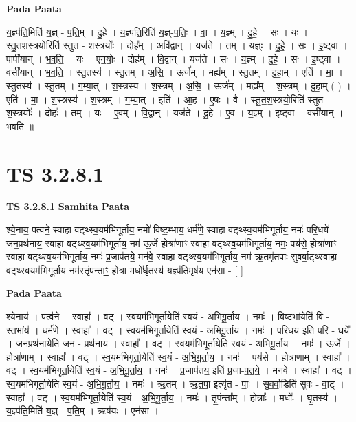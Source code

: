 \documentclass[17pt]{extarticle}
\begin{document}
\textbf{Pada Paata} \newline

य॒ज्ञ्प॑ति॒मिति॑ य॒ज्ञ् - प॒ति॒म् । दु॒हे । य॒ज्ञ्प॑ति॒रिति॑ य॒ज्ञ्-प॒तिः॒ । वा॒ । य॒ज्ञ्म् । दु॒हे॒ । सः । यः । स्तु॒त॒श॒स्त्रयो॒रिति॑ स्तुत - श॒स्त्रयोः᳚ । दोह᳚म् । अवि॑द्वान् । यज॑ते । तम् । य॒ज्ञ्ः । दु॒हे॒ । सः । इ॒ष्ट्वा । पापी॑यान् । भ॒व॒ति॒ । यः । ए॒न॒योः॒ । दोह᳚म् । वि॒द्वान् । यज॑ते । सः । य॒ज्ञ्म् । दु॒हे॒ । सः । इ॒ष्ट्वा । वसी॑यान् । भ॒व॒ति॒ । स्तु॒तस्य॑ । स्तु॒तम् । अ॒सि॒ । ऊर्ज᳚म् । मह्य᳚म् । स्तु॒तम् । दु॒हा॒म् । एति॑ । मा॒ । स्तु॒तस्य॑ । स्तु॒तम् । ग॒म्या॒त् । श॒स्त्रस्य॑ । श॒स्त्रम् । अ॒सि॒ । ऊर्ज᳚म् । मह्य᳚म् । श॒स्त्रम् । दु॒हा॒म् ( ) । एति॑ । मा॒ । श॒स्त्रस्य॑ । श॒स्त्रम् । ग॒म्या॒त् । इति॑ । आ॒ह॒ । ए॒षः । वै । स्तु॒त॒श॒स्त्रयो॒रिति॑ स्तुत - श॒स्त्रयोः᳚ । दोहः॑ । तम् । यः । ए॒वम् । वि॒द्वान् । यज॑ते । दु॒हे । ए॒व । य॒ज्ञ्म् । इ॒ष्ट्वा । वसी॑यान् । भ॒व॒ति॒ ॥  \newline





\section{ TS 3.2.8.1 }

\textbf{TS 3.2.8.1 } \newline
\textbf{Samhita Paata} \newline

श्ये॒नाय॒ पत्व॑ने॒ स्वाहा॒ वट्थ्स्व॒यम॑भिगूर्ताय॒ नमो॑ विष्ट॒म्भाय॒ धर्म॑णे॒ स्वाहा॒ वट्थ्स्व॒यम॑भिगूर्ताय॒ नमः॑ परि॒धये॑ जन॒प्रथ॑नाय॒ स्वाहा॒ वट्थ्स्व॒यम॑भिगूर्ताय॒ नम॑ ऊ॒र्जे होत्रा॑णाꣳ॒॒ स्वाहा॒ वट्थ्स्व॒यम॑भिगूर्ताय॒ नमः॒ पय॑से॒ होत्रा॑णाꣳ॒॒ स्वाहा॒ वट्थ्स्व॒यम॑भिगूर्ताय॒ नमः॑ प्र॒जाप॑तये॒ मन॑वे॒ स्वाहा॒ वट्थ्स्व॒यम॑भिगूर्ताय॒ नम॑ ऋ॒तमृ॑तपाः सुवर्वा॒ट्थ्स्वाहा॒ वट्थ्स्व॒यम॑भिगूर्ताय॒ नम॑स्तृं॒पन्ताꣳ॒॒ होत्रा॒ मधो᳚र्घृ॒तस्य॑ य॒ज्ञ्प॑ति॒मृष॑य॒ एन॑सा - [  ] \newline

\textbf{Pada Paata} \newline

श्ये॒नाय॑ । पत्व॑ने । स्वाहा᳚ । वट् । स्व॒यम॑भिगूर्ता॒येति॑ स्व॒यं - अ॒भि॒गू॒र्ता॒य॒ । नमः॑ । वि॒ष्ट॒भांयेति॑ वि - स्त॒भांय॑ । धर्म॑णे । स्वाहा᳚ । वट् । स्व॒यम॑भिगूर्ता॒येति॑ स्व॒यं - अ॒भि॒गू॒र्ता॒य॒ । नमः॑ । प॒रि॒धय॒ इति॑ परि - धये᳚ । ज॒न॒प्रथ॑ना॒येति॑ जन - प्रथ॑नाय । स्वाहा᳚ । वट् । स्व॒यम॑भिगूर्ता॒येति॑ स्व॒यं - अ॒भि॒गू॒र्ता॒य॒ । नमः॑ । ऊ॒र्जे । होत्रा॑णाम् । स्वाहा᳚ । वट् । स्व॒यम॑भिगूर्ता॒येति॑ स्व॒यं - अ॒भि॒गू॒र्ता॒य॒ । नमः॑ । पय॑से । होत्रा॑णाम् । स्वाहा᳚ । वट् । स्व॒यम॑भिगूर्ता॒येति॑ स्व॒यं - अ॒भि॒गू॒र्ता॒य॒ । नमः॑ । प्र॒जाप॑तय॒ इति॑ प्र॒जा-प॒त॒ये॒ । मन॑वे । स्वाहा᳚ । वट् । स्व॒यम॑भिगूर्ता॒येति॑ स्व॒यं - अ॒भि॒गू॒र्ता॒य॒ । नमः॑ । ऋ॒तम् । ऋ॒त॒पा॒ इत्यृ॑त - पाः॒ । सु॒व॒र्वा॒डिति॑ सुवः - वा॒ट् । स्वाहा᳚ । वट् । स्व॒यम॑भिगूर्ता॒येति॑ स्व॒यं - अ॒भि॒गू॒र्ता॒य॒ । नमः॑ । तृ॒पंन्ता᳚म् । होत्राः᳚ । मधोः᳚ । घृ॒तस्य॑ । य॒ज्ञ्प॑ति॒मिति॑ य॒ज्ञ् - प॒ति॒म् । ऋष॑यः । एन॑सा ।  \newline
\end{document}
